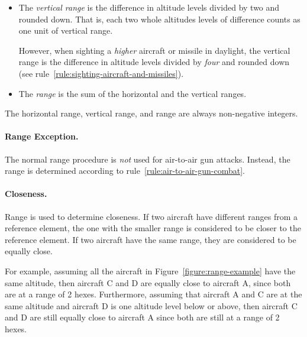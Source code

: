 {\begin{itemize}
Figure~\ref{figure:range-example} gives examples of horizontal ranges.

\item
The \emph{vertical range} is the difference in altitude levels divided by two and rounded down. That is, each two whole altitudes levels of difference counts as one unit of vertical range.

However, when sighting a \emph{higher} aircraft or missile in daylight, the vertical range is the difference in altitude levels divided by \emph{four} and rounded down (see rule~\ref{rule:sighting-aircraft-and-missiles}).

\item
The \emph{range} is the sum of the horizontal and the vertical ranges.
\end{itemize}

The horizontal range, vertical range, and range are always non-negative integers.

\paragraph{Range Exception.}
The normal range procedure is \emph{not} used for air-to-air gun attacks. Instead, the range is determined according to rule~\ref{rule:air-to-air-gun-combat}.

\paragraph{Closeness.}
\label{rule:closeness}

Range is used to determine closeness. If two aircraft have different ranges from a reference element, the one with the smaller range is considered to be closer to the reference element. If two aircraft have the same range, they are considered to be equally close.

For example, assuming all the aircraft in Figure~\ref{figure:range-example} have the same altitude, then aircraft C and D are equally close to aircraft A, since both are at a range of 2 hexes. Furthermore, assuming that aircraft A and C are at the same altitude and aircraft D is one altitude level below or above, then aircraft C and D are still equally close to aircraft A since both are still at a range of 2 hexes.

}


